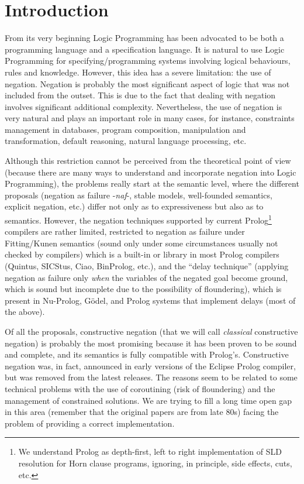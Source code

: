 \documentclass{tlp}
\newcommand{\naf}{{\em naf}}\newcommand{\viejo}[1]{}
\begin{document}

\section{Introduction}
\label{introduction}
From its very beginning Logic Programming has been advocated to be
both a programming language and a specification language. It is
natural to use Logic Programming for specifying/programming systems
involving logical behaviours, rules and knowledge. However, this idea
has a severe limitation: the use of negation. Negation is probably the
most significant aspect of logic that was not included from the
outset. This is due to the fact that dealing with negation involves
significant additional complexity. Nevertheless, the use of negation
is very natural and plays an important role in many cases, for
instance, constraints management in databases, program composition,
manipulation and transformation, default reasoning, natural language
processing, etc.

Although this restriction cannot be perceived from the theoretical
point of view (because there are many ways to understand and
incorporate negation into Logic Programming), the problems really
start at the semantic level, where the different proposals (negation
as failure -\naf-, stable models, well-founded semantics, explicit
negation, etc.)  differ not only as to expressiveness but also as to
semantics.  However, the negation techniques supported by current
Prolog\footnote{We understand Prolog as depth-first, left to
right implementation of SLD resolution for Horn clause programs,
ignoring, in principle, side effects, cuts, etc.}  compilers are
rather limited, restricted to negation as failure under Fitting/Kunen
semantics \cite{Kunen} (sound only under some circumstances usually
not checked by compilers) which is a built-in or library in most
Prolog compilers (Quintus, SICStus, Ciao, BinProlog, etc.), and the
``delay technique'' (applying negation as failure only \emph{when} the
variables of the negated goal become ground, which is sound but
incomplete due to the possibility of floundering), which is present in
Nu-Prolog, G\"odel, and Prolog systems that implement delays (most of
the above).

Of all the proposals, constructive negation \cite{Chan1,Chan2} (that
we will call \emph{classical} constructive negation) is probably the
most promising because it has been proven to be sound and complete,
and its semantics is fully compatible with Prolog's. Constructive
negation was, in fact, announced in early versions of the Eclipse
Prolog compiler, but was removed from the latest releases.  The
reasons seem to be related to some technical problems with the use of
coroutining (risk of floundering) and the management of constrained
solutions. We are trying to fill a long time open gap in this area
(remember that the original papers are from late 80s) facing the
problem of providing a correct implementation.
\end{document}
